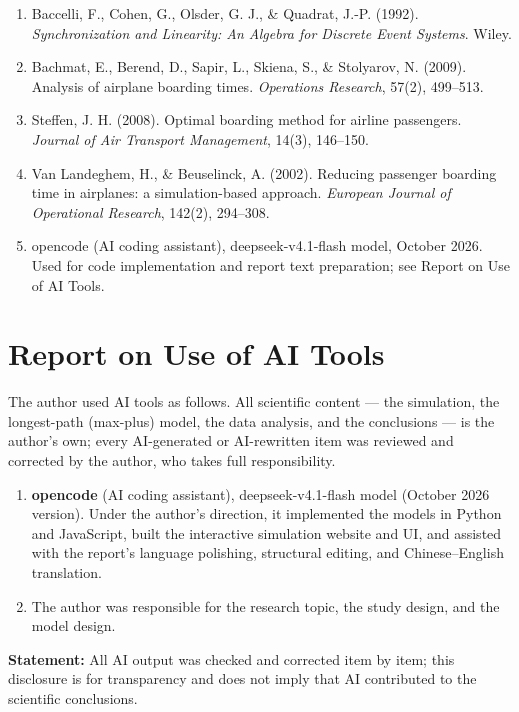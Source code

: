 \documentclass[
  11pt,
  a4paper]{article}
\providecommand{\tightlist}{%
  \setlength{\itemsep}{0pt}\setlength{\parskip}{0pt}}
\begin{document}
\begin{enumerate}
\def\labelenumi{\arabic{enumi}.}
\tightlist
\item
  Baccelli, F., Cohen, G., Olsder, G. J., \& Quadrat, J.-P. (1992).
  \emph{Synchronization and Linearity: An Algebra for Discrete Event
  Systems}. Wiley.
\item
  Bachmat, E., Berend, D., Sapir, L., Skiena, S., \& Stolyarov, N.
  (2009). Analysis of airplane boarding times. \emph{Operations
  Research}, 57(2), 499--513.
\item
  Steffen, J. H. (2008). Optimal boarding method for airline passengers.
  \emph{Journal of Air Transport Management}, 14(3), 146--150.
\item
  Van Landeghem, H., \& Beuselinck, A. (2002). Reducing passenger
  boarding time in airplanes: a simulation-based approach.
  \emph{European Journal of Operational Research}, 142(2), 294--308.
\item
  opencode (AI coding assistant), deepseek-v4.1-flash model, October
  2026. Used for code implementation and report text preparation; see
  Report on Use of AI Tools.
\end{enumerate}

\section{Report on Use of AI Tools}\label{report-on-use-of-ai-tools}

The author used AI tools as follows. All scientific content --- the
simulation, the longest-path (max-plus) model, the data analysis, and
the conclusions --- is the author's own; every AI-generated or
AI-rewritten item was reviewed and corrected by the author, who takes
full responsibility.

\begin{enumerate}
\def\labelenumi{\arabic{enumi}.}
\tightlist
\item
  \textbf{opencode} (AI coding assistant), deepseek-v4.1-flash model
  (October 2026 version). Under the author's direction, it implemented
  the models in Python and JavaScript, built the interactive simulation
  website and UI, and assisted with the report's language polishing,
  structural editing, and Chinese--English translation.
\item
  The author was responsible for the research topic, the study design,
  and the model design.
\end{enumerate}

\textbf{Statement:} All AI output was checked and corrected item by
item; this disclosure is for transparency and does not imply that AI
contributed to the scientific conclusions.
\end{document}
